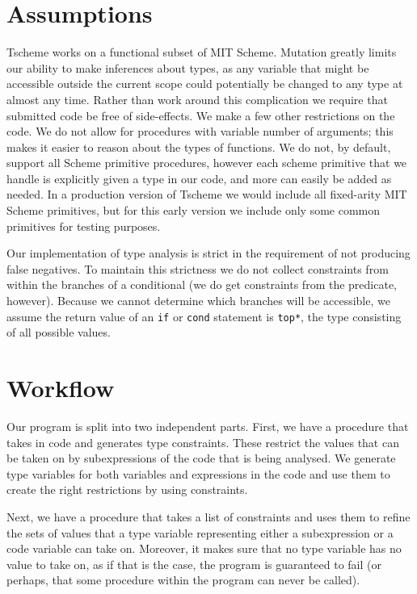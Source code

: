 \documentclass[a4paper]{article}
\begin{document}
\section{Assumptions}

Tscheme works on a functional subset of MIT Scheme.  Mutation greatly limits 
our ability to make inferences about types, as any variable that might be 
accessible outside the current scope could potentially be changed to any type 
at almost any time.  Rather than work around this complication we require that
submitted code be free of side-effects.  We make a few other restrictions on 
the code.  We do not allow for procedures with variable number of arguments;
this makes it easier to reason about the types of functions.  We do not, by 
default, support all Scheme primitive procedures, however each scheme 
primitive that we handle is explicitly given a type in our code, and more can 
easily be added as needed.  In a production version of Tscheme we would 
include all fixed-arity MIT Scheme primitives, but for this early version we include only 
some common primitives for testing purposes.

Our implementation of type analysis is strict in the requirement of not producing 
false negatives.  To maintain this strictness we do not collect constraints 
from within the branches of a conditional (we do get constraints from the 
predicate, however).  Because we cannot determine which branches will be 
accessible, we assume the return value of an {\tt if} or {\tt cond}
statement is {\tt *top*}, the type consisting of all possible values.


\section{Workflow}

Our program is split into two independent parts.
First, we have a procedure that takes in code and generates type constraints.
These restrict the values that can be taken on by subexpressions of the
code that is being analysed.
We generate type variables for both variables and expressions in the code
and use them to create the right restrictions by using constraints.

Next, we have a procedure that takes a list of constraints and uses them to
refine the sets of values that a type variable representing either a subexpression
or a code variable can take on.
Moreover, it makes sure that no type variable has no value to take on,
as if that is the case, the program is guaranteed to fail (or perhaps, that
some procedure within the program can never be called).
\end{document}
